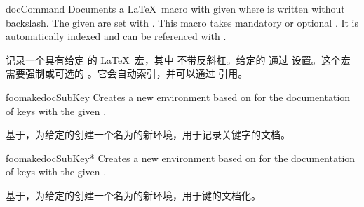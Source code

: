 \begin{docEnvironment}[doclang/environment content=command description,doc updated=2020-04-22]
  {docCommand}{}
Documents a \LaTeX\ macro with given  where  is
written without backslash. The given  are set with .
This macro takes mandatory or optional .
It is automatically indexed and can be referenced with
.

记录一个具有给定  的 \LaTeX\ 宏，其中  不带反斜杠。给定的  通过  设置。这个宏需要强制或可选的 。它会自动索引，并可以通过  引用。
\begin{dispExample}
\begin{docCommand}{foomakedocSubKey}{}
Creates a new environment  based on  for the
documentation of keys with the given .

基于，为给定的创建一个名为的新环境，用于记录关键字的文档。
\end{docCommand}
\end{dispExample}
\begin{dispExample}
\begin{docCommand}[color definition=blue]{foomakedocSubKey*}%
  {}
Creates a new environment  based on  for the
documentation of keys with the given .

基于，为给定的创建一个名为的新环境，用于键的文档化。
\end{docCommand}
\end{dispExample}
\end{docEnvironment}